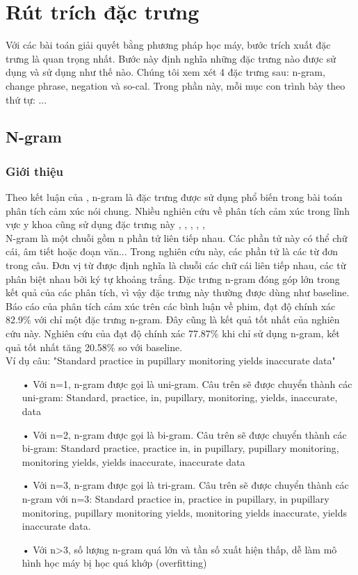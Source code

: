 \section{Rút trích đặc trưng}
Với các bài toán giải quyết bằng phương pháp học máy, bước trích xuất đặc trưng là quan trọng nhất. Bước này định nghĩa những đặc trưng nào được sử dụng và sử dụng như thế nào. Chúng tôi xem xét 4 đặc trưng sau: n-gram, change phrase, negation và so-cal. Trong phần này, mỗi mục con trình bày theo thứ tự: ...
\subsection{N-gram}
\subsubsection*{Giới thiệu}
Theo kết luận của \cite{chandrakala2012opinion}, n-gram là đặc trưng được sử dụng phổ biến trong bài toán phân tích cảm xúc nói chung. Nhiều nghiên cứu về phân tích cảm xúc trong lĩnh vực y khoa cũng sử dụng đặc trưng này \cite{pang2002thumbs}, \cite{niu2005analysis}, \cite{sarker2011outcome}, \cite{niu2006using}, \cite{pestian2012sentie}, \cite{xia09improving} \\

N-gram là một chuỗi gồm n phần tử liên tiếp nhau. Các phần tử này có thể chữ cái, âm tiết hoặc đoạn văn... Trong nghiên cứu này, các phần tử là các từ đơn trong câu. Đơn vị từ được định nghĩa là chuỗi các chữ cái liên tiếp nhau, các từ phân biệt nhau bởi ký tự khoảng trắng. Đặc trưng n-gram đóng góp lớn trong kết quả của các phân tích, vì vậy đặc trưng này thường được dùng như baseline. Báo cáo  của \cite{pang2002thumbs} phân tích cảm xúc trên các bình luận về phim, đạt độ chính xác 82.9\% với chỉ một đặc trưng n-gram. Đây cũng là kết quả tốt nhất của nghiên cứu này. Nghiên cứu của \cite{niu2005analysis} đạt độ chính xác 77.87\% khi chỉ sử dụng n-gram, kết quả tốt nhất tăng 20.58\% so với baseline. \\

Ví dụ câu: "Standard practice in pupillary monitoring yields inaccurate data"
\begin{itemize}
\item[•]Với n=1, n-gram được gọi là uni-gram. Câu trên sẽ được chuyển thành các uni-gram: Standard, practice, in, pupillary, monitoring, yields, inaccurate, data
\item[•]Với n=2, n-gram được gọi là bi-gram. Câu trên sẽ được chuyển thành các bi-gram: Standard practice, practice in, in pupillary, pupillary monitoring, monitoring yields, yields inaccurate, inaccurate data
\item[•]Với n=3, n-gram được gọi là tri-gram. Câu trên sẽ được chuyển thành các n-gram với n=3: Standard practice in, practice in pupillary, in pupillary monitoring, pupillary monitoring yields, monitoring yields inaccurate, yields inaccurate data.
\item[•]Với n>3, số lượng n-gram quá lớn và tần số xuất hiện thấp, dễ làm mô hình học máy bị học quá khớp (overfitting)
\end{itemize}

